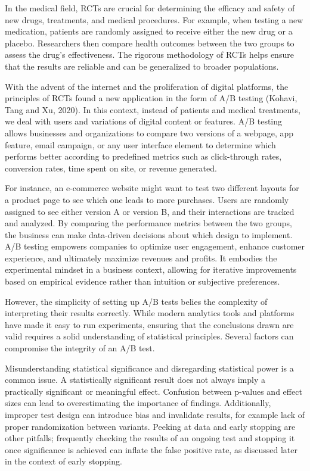 \documentclass[final,5p,times,twocolumn,authoryear]{elsarticle}
\begin{document}
In the medical field, RCTs are crucial for determining the efficacy and safety of new drugs, treatments, and medical procedures. For example, when testing a new medication, patients are randomly assigned to receive either the new drug or a placebo. Researchers then compare health outcomes between the two groups to assess the drug's effectiveness. The rigorous methodology of RCTs helps ensure that the results are reliable and can be generalized to broader populations.

With the advent of the internet and the proliferation of digital platforms, the principles of RCTs found a new application in the form of A/B testing (Kohavi, Tang and Xu, 2020). In this context, instead of patients and medical treatments, we deal with users and variations of digital content or features. A/B testing allows businesses and organizations to compare two versions of a webpage, app feature, email campaign, or any user interface element to determine which performs better according to predefined metrics such as click-through rates, conversion rates, time spent on site, or revenue generated.

For instance, an e-commerce website might want to test two different layouts for a product page to see which one leads to more purchases. Users are randomly assigned to see either version A or version B, and their interactions are tracked and analyzed. By comparing the performance metrics between the two groups, the business can make data-driven decisions about which design to implement. A/B testing empowers companies to optimize user engagement, enhance customer experience, and ultimately maximize revenues and profits. It embodies the experimental mindset in a business context, allowing for iterative improvements based on empirical evidence rather than intuition or subjective preferences.

However, the simplicity of setting up A/B tests belies the complexity of interpreting their results correctly. While modern analytics tools and platforms have made it easy to run experiments, ensuring that the conclusions drawn are valid requires a solid understanding of statistical principles. Several factors can compromise the integrity of an A/B test.

Misunderstanding statistical significance and disregarding statistical power is a common issue. A statistically significant result does not always imply a practically significant or meaningful effect. Confusion between p-values and effect sizes can lead to overestimating the importance of findings. Additionally, improper test design can introduce bias and invalidate results, for example lack of proper randomization between variants. Peeking at data and early stopping are other pitfalls; frequently checking the results of an ongoing test and stopping it once significance is achieved can inflate the false positive rate, as discussed later in the context of early stopping.
\end{document}
